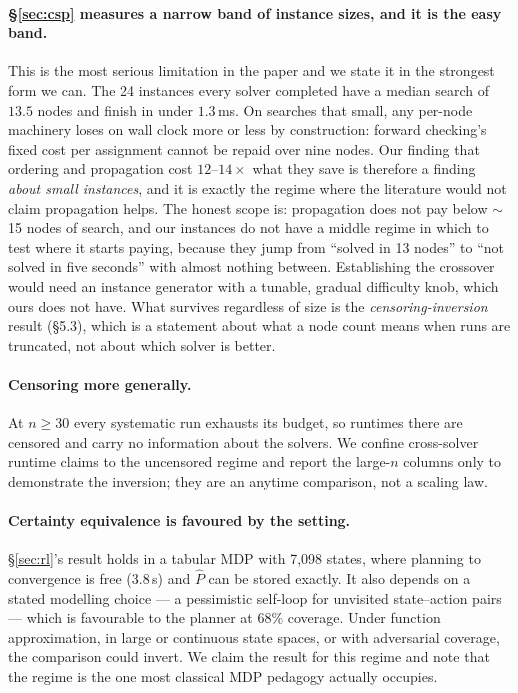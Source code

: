 \documentclass[11pt]{article}
\begin{document}
\paragraph{\S\ref{sec:csp} measures a narrow band of instance sizes, and it is the easy band.}
This is the most serious limitation in the paper and we state it in the strongest form we can. The
24 instances every solver completed have a median search of $13.5$ nodes and finish in under
$1.3$\,ms. On searches that small, any per-node machinery loses on wall clock more or less by
construction: forward checking's fixed cost per assignment cannot be repaid over nine nodes. Our
finding that ordering and propagation cost $12$--$14\times$ what they save is therefore a finding
\emph{about small instances}, and it is exactly the regime where the literature would not claim
propagation helps. The honest scope is: propagation does not pay below $\sim$15 nodes of search,
and our instances do not have a middle regime in which to test where it starts paying, because
they jump from ``solved in 13 nodes'' to ``not solved in five seconds'' with almost nothing
between. Establishing the crossover would need an instance generator with a tunable, gradual
difficulty knob, which ours does not have. What survives regardless of size is the
\emph{censoring-inversion} result (\S5.3), which is a statement about what a node count means when
runs are truncated, not about which solver is better.

\paragraph{Censoring more generally.} At $n \geq 30$ every systematic run exhausts its budget, so
runtimes there are censored and carry no information about the solvers. We confine cross-solver
runtime claims to the uncensored regime and report the large-$n$ columns only to demonstrate the
inversion; they are an anytime comparison, not a scaling law.

\paragraph{Certainty equivalence is favoured by the setting.} \S\ref{sec:rl}'s result holds in a
tabular MDP with 7,098 states, where planning to convergence is free (3.8\,s) and
$\hat{P}$ can be stored exactly. It also depends on a stated modelling choice --- a pessimistic
self-loop for unvisited state--action pairs --- which is favourable to the planner at $68\%$
coverage. Under function approximation, in large or continuous state spaces, or with adversarial
coverage, the comparison could invert. We claim the result for this regime and note that the regime
is the one most classical MDP pedagogy actually occupies.
\end{document}
